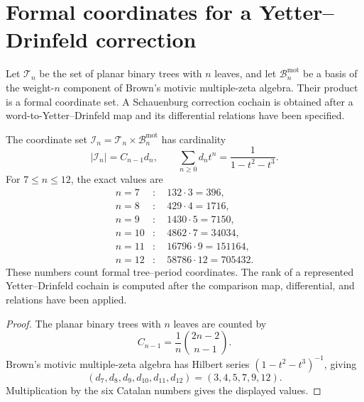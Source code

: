 \section{Formal coordinates for a Yetter--Drinfeld correction}
\label{sec:YD-delta-n-7-8-9}

Let \(\mathcal T_n\) be the set of planar binary trees with \(n\)
leaves, and let \(\mathcal B_n^{\mathrm{mot}}\) be a basis of the weight-\(n\)
component of Brown's motivic multiple-zeta algebra.  Their product is
a formal coordinate set.  A Schauenburg correction cochain is obtained
after a word-to-Yetter--Drinfeld map and its differential relations
have been specified.

\begin{theorem}
\label{thm:YD-delta-7-8-9}
%
The coordinate set
\(\mathcal I_n=\mathcal T_n\times\mathcal B_n^{\mathrm{mot}}\) has cardinality
\[
 |\mathcal I_n|=C_{n-1}d_n,
 \qquad
 \sum_{n\ge0}d_nt^n=\frac{1}{1-t^2-t^3}.
\]
For \(7\le n\le12\), the exact values are
\begin{equation}
\begin{aligned}
n=7 &: \quad 132\cdot3=396,\\
n=8 &: \quad 429\cdot4=1716,\\
n=9 &: \quad 1430\cdot5=7150,\\
n=10&: \quad 4862\cdot7=34034,\\
n=11&: \quad 16796\cdot9=151164,\\
n=12&: \quad 58786\cdot12=705432.
\end{aligned}
\label{eq:YD-delta-789-dim}
\end{equation}
These numbers count formal tree--period coordinates.  The rank of a
represented Yetter--Drinfeld cochain is computed after the comparison
map, differential, and relations have been applied.
\end{theorem}

\begin{proof}
The planar binary trees with \(n\) leaves are counted by
\[
 C_{n-1}=\frac1n\binom{2n-2}{n-1}.
\]
Brown's motivic multiple-zeta algebra has Hilbert series
\((1-t^2-t^3)^{-1}\), giving
\[
 (d_7,d_8,d_9,d_{10},d_{11},d_{12})=(3,4,5,7,9,12).
\]
Multiplication by the six Catalan numbers gives the displayed values.
\end{proof}

